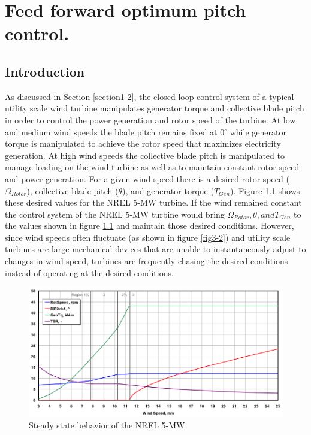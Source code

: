 
\chapter{Feed forward optimum pitch control.} %

\label{Chapter3} %



\section{Introduction} \label{section3-1}
As discussed in Section \ref{section1-2}, the closed loop control system of a typical utility scale wind turbine manipulates generator torque and collective blade pitch in order to control the power generation and rotor speed of the turbine. At low and medium wind speeds the blade pitch remains fixed at 0$^\circ$ while generator torque is manipulated to achieve the rotor speed that maximizes electricity generation. At high wind speeds the collective blade pitch is manipulated to manage loading on the wind turbine as well as to maintain constant rotor speed and power generation. For a given wind speed there is a desired rotor speed ($\Omega_{Rotor}$), collective blade pitch ($\theta$), and generator torque ($T_{Gen}$). Figure \ref{fig3-1} shows these desired values for the NREL 5-MW turbine. If the wind remained constant the control system of the NREL 5-MW turbine would bring $\Omega_{Rotor}, \theta, and T_{Gen}$ to the values shown in figure \ref{fig3-1} and maintain those desired conditions. However, since wind speeds often fluctuate (as shown in figure \ref{fig3-2}) and utility scale turbines are large mechanical devices that are unable to instantaneously adjust to changes in wind speed, turbines are frequently chasing the desired conditions instead of operating at the desired conditions.

\begin{figure}[htbp]
	\centering
		\includegraphics[width=\linewidth]{Figures/ch2Figures/fig2-1.png}
		
	\caption{Steady state behavior of the NREL 5-MW.\cite{jonkman2009}}
	\label{fig3-1}
\end{figure}

